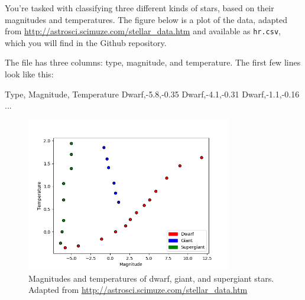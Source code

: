 \documentclass[submit]{harvardml}
\begin{document}
You're tasked with classifying three different kinds of stars, based
on their magnitudes and temperatures.  The figure below is a plot of
the data, adapted from
\url{http://astrosci.scimuze.com/stellar_data.htm} and available as
\verb|hr.csv|, which you will find in the Github repository.

The file has three columns: type, magnitude, and temperature. The
first few lines look like this:
\begin{csv}
Type, Magnitude, Temperature
Dwarf,-5.8,-0.35
Dwarf,-4.1,-0.31
Dwarf,-1.1,-0.16
...
\end{csv}

\begin{figure}[h]
\centering
\includegraphics[width=0.8\textwidth]{star}
\caption{Magnitudes and temperatures of dwarf, giant, and supergiant stars. Adapted from \url{http://astrosci.scimuze.com/stellar_data.htm}}
\end{figure}
\end{document}

